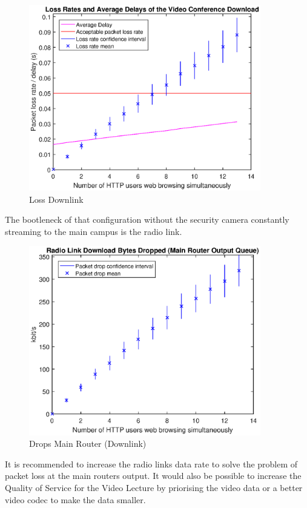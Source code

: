 \documentclass[a4paper,10pt]{book}\usepackage{graphicx}
\begin{document}
\begin{figure}[!ht]
  \centering
    \label{fig:losslecdown}
    \includegraphics[width=0.9\textwidth]{off_loss_conf_download.eps}
  
    \caption{Loss Downlink}
\end{figure}
The bootleneck of that configuration without the security camera constantly streaming to the main campus 
is the radio link.
\begin{figure}[!ht]
 \label{fig:mainRdrops}
  \centering
    \includegraphics[width=0.9\textwidth]{off_main_router_drops.eps}
    \caption{Drops Main Router (Downlink)}
\end{figure}

It is recommended to increase the radio links data rate to solve the problem of packet loss at the main routers output. It would also be possible to increase the Quality of Service for the Video Lecture 
by priorising the video data or a better video codec to make the data smaller.
\end{document}
